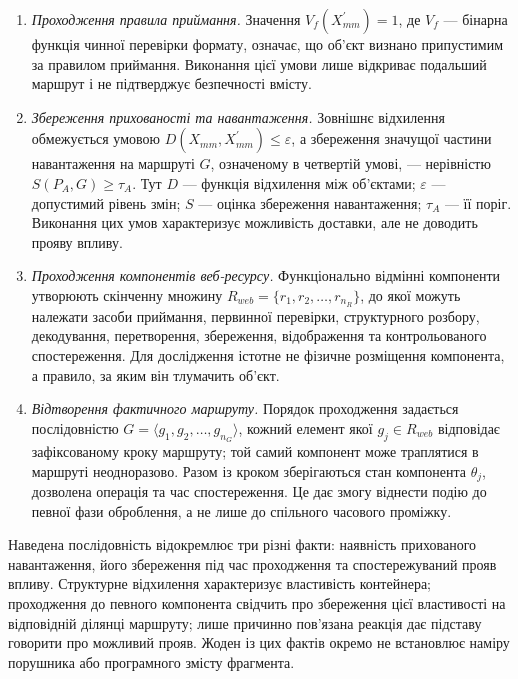 \begin{enumerate}
\item \textit{Проходження правила приймання.} Значення $V_f(X_{mm}^{\prime})=1$, де $V_f$ --- бінарна функція чинної перевірки формату, означає, що об’єкт визнано припустимим за правилом приймання. Виконання цієї умови лише відкриває подальший маршрут і не підтверджує безпечності вмісту.

\item \textit{Збереження прихованості та навантаження.} Зовнішнє відхилення обмежується умовою $D(X_{mm},X_{mm}^{\prime})\leq\varepsilon$, а збереження значущої частини навантаження на маршруті $G$, означеному в четвертій умові, --- нерівністю $S(P_A,G)\geq\tau_A$. Тут $D$ --- функція відхилення між об’єктами; $\varepsilon$ --- допустимий рівень змін; $S$ --- оцінка збереження навантаження; $\tau_A$ --- її поріг. Виконання цих умов характеризує можливість доставки, але не доводить прояву впливу.

\item \textit{Проходження компонентів веб-ресурсу.} Функціонально відмінні компоненти утворюють скінченну множину $R_{web}=\{r_1,r_2,\ldots,r_{n_R}\}$, до якої можуть належати засоби приймання, первинної перевірки, структурного розбору, декодування, перетворення, збереження, відображення та контрольованого спостереження. Для дослідження істотне не фізичне розміщення компонента, а правило, за яким він тлумачить об’єкт.

\item \textit{Відтворення фактичного маршруту.} Порядок проходження задається послідовністю $G=\langle g_1,g_2,\ldots,g_{n_G}\rangle$, кожний елемент якої $g_j\in R_{web}$ відповідає зафіксованому кроку маршруту; той самий компонент може траплятися в маршруті неодноразово. Разом із кроком зберігаються стан компонента $\theta_j$, дозволена операція та час спостереження. Це дає змогу віднести подію до певної фази оброблення, а не лише до спільного часового проміжку.
\end{enumerate}

Наведена послідовність відокремлює три різні факти: наявність прихованого навантаження, його збереження під час проходження та спостережуваний прояв впливу. Структурне відхилення характеризує властивість контейнера; проходження до певного компонента свідчить про збереження цієї властивості на відповідній ділянці маршруту; лише причинно пов’язана реакція дає підставу говорити про можливий прояв. Жоден із цих фактів окремо не встановлює наміру порушника або програмного змісту фрагмента.

